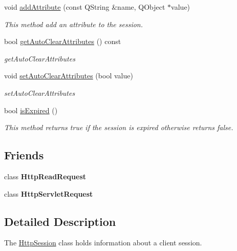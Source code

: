 \begin{DoxyCompactItemize}
void \mbox{\hyperlink{class_http_session_a9d7250801e2b43f61b28facf2b48c1b5}{add\+Attribute}} (const Q\+String \&name, Q\+Object $\ast$value)
\begin{DoxyCompactList}\small\item\em This method add an attribute to the session. \end{DoxyCompactList}\item 
bool \mbox{\hyperlink{class_http_session_a0bb33f4c387b07264245de390984be10}{get\+Auto\+Clear\+Attributes}} () const
\begin{DoxyCompactList}\small\item\em get\+Auto\+Clear\+Attributes \end{DoxyCompactList}\item 
void \mbox{\hyperlink{class_http_session_a6ba761b5e4935168f867b3e4953a4179}{set\+Auto\+Clear\+Attributes}} (bool value)
\begin{DoxyCompactList}\small\item\em set\+Auto\+Clear\+Attributes \end{DoxyCompactList}\item 
\mbox{\label{class_http_session_a32e93aea1e8bbadcdf0d755110a95335}} 
bool \mbox{\hyperlink{class_http_session_a32e93aea1e8bbadcdf0d755110a95335}{is\+Expired}} ()
\begin{DoxyCompactList}\small\item\em This method returns true if the session is expired otherwise returns false. \end{DoxyCompactList}\end{DoxyCompactItemize}
\subsection*{Friends}
\begin{DoxyCompactItemize}
\item 
\mbox{\label{class_http_session_a4d54f5003e07e218070a449c22a52c7c}} 
class {\bfseries Http\+Read\+Request}
\item 
\mbox{\label{class_http_session_aebfae296d1cbb22eed705b7950266081}} 
class {\bfseries Http\+Servlet\+Request}
\end{DoxyCompactItemize}


\subsection{Detailed Description}
The \mbox{\hyperlink{class_http_session}{Http\+Session}} class holds information about a client session. 

